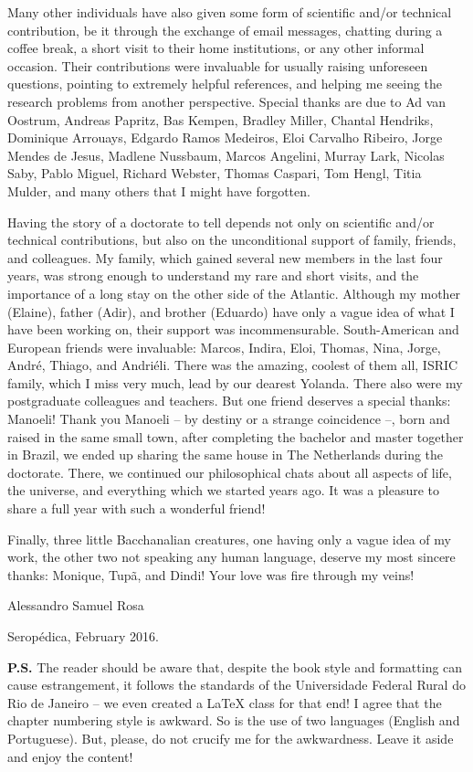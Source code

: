Many other individuals have also given some form of scientific and/or technical contribution, be it through 
the exchange of email messages, chatting during a coffee break, a short visit to their home institutions, or 
any other informal occasion. Their contributions were invaluable for usually raising unforeseen questions, 
pointing to extremely helpful references, and helping me seeing the research problems from another perspective.
Special thanks are due to Ad van Oostrum, Andreas Papritz, Bas Kempen, Bradley Miller, Chantal Hendriks, 
Dominique Arrouays, Edgardo Ramos Medeiros, Eloi Carvalho Ribeiro, Jorge Mendes de Jesus, Madlene Nussbaum, 
Marcos Angelini, Murray Lark, Nicolas Saby, Pablo Miguel, Richard Webster, Thomas Caspari, Tom Hengl, Titia 
Mulder, and many others that I might have forgotten.

Having the story of a doctorate to tell depends not only on scientific and/or technical contributions,
but also on the unconditional support of family, friends, and colleagues. My family, which gained several new 
members in the last four years, was strong enough to understand my rare and short visits, and the importance 
of a long stay on the other side of the Atlantic. Although my mother (Elaine), father (Adir), and brother 
(Eduardo) have only a vague idea of what I have been working on, their support was incommensurable. 
South-American and European friends were invaluable: Marcos, Indira, Eloi, Thomas, Nina, Jorge, André, Thiago, 
and Andriéli. There was the amazing, coolest of them all, ISRIC family, which I miss very much, lead by 
our dearest Yolanda. There also were my postgraduate colleagues and teachers. But one friend deserves a special 
thanks: Manoeli! Thank you Manoeli -- by destiny or a strange coincidence --, born and raised in the same small 
town, after completing the bachelor and master together in Brazil, we ended up sharing the same house in The 
Netherlands during the doctorate. There, we continued our philosophical chats about all aspects of life, the 
universe, and everything which we started years ago. It was a pleasure to share a full year with such a 
wonderful friend!

Finally, three little Bacchanalian creatures, one having only a vague idea of my work, the other two not 
speaking any human language, deserve my most sincere thanks: Monique, Tupã, and Dindi! Your love was fire 
through my veins!

\begin{flushright}
 Alessandro Samuel Rosa
 
 Seropédica, February 2016.
\end{flushright}

\noindent
\textbf{P.S.} The reader should be aware that, despite the book style and formatting can cause estrangement, 
it follows the standards of the Universidade Federal Rural do Rio de Janeiro -- we even created a \LaTeX{} 
class for that end! I agree that the chapter numbering style is awkward. So is the use of two languages 
(English and Portuguese). But, please, do not crucify me for the awkwardness. Leave it aside and enjoy the 
content!
